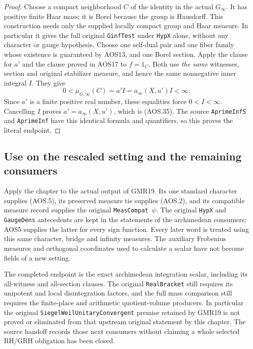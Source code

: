 \begin{proof}
Choose a compact neighborhood $C$ of the identity in the actual
$G_\infty$.  It has positive finite Haar mass; it is Borel because
the group is Hausdorff.  This construction needs only the supplied
locally compact group and Haar measure.  In particular it gives
the full original \texttt{GinfTest} under \texttt{HypX} alone,
without any character or gauge hypothesis.  Choose one self-dual
pair and one fiber family
whose existence is guaranteed by AOS13, and one Borel section.
Apply the clause for $a'$ and the clause proved in AOS17 to
$f=1_C$.  Both use \emph{the same} witnesses, section and original
stabilizer measure, and hence the same nonnegative inner integral
$I$.  They give
\[
              0<\mu_{G,\infty}(C)=a'I
                      =a_\infty(X,u')I<\infty.
\]
Since $a'$ is a finite positive real number, these equalities
force $0<I<\infty$.  Cancelling $I$ proves
$a'=a_\infty(X,u')$, which is (AOS.35).  The source
\texttt{AprimeInfS} and \texttt{AprimeInf} have this identical
formula and quantifiers, so this proves the literal endpoint.
\end{proof}

\subsection{Use on the rescaled setting and the remaining consumers}

Apply the chapter to the actual output of GMR19.  Its one standard
character supplies (AOS.5), its preserved measure tie supplies
(AOS.2), and its compatible measure record supplies the original
\texttt{MeasCompat\,$\psi$}.  The original \texttt{HypX} and
\texttt{GaugeDens} antecedents are kept in the statements of the
archimedean consumers; AOS5 supplies the latter for every sign
function.  Every later word is treated using this same
character, bridge and infinity measures.  The auxiliary Frobenius
measures and orthogonal coordinates used to calculate a scalar
have not become fields of a new setting.

The completed endpoint is the exact archimedean integration scalar,
including its all-witness and all-section clauses.  The original
\texttt{RealBracket} still requires its unipotent and local
disintegration factors, and the full mass comparison still requires
the finite-place and arithmetic quotient-volume producers.  In
particular the original \texttt{SiegelWeilUnitaryConvergent}
premise retained by GMR19 is not proved or eliminated from that
upstream original statement by this chapter.  The source handoff
records those next consumers without claiming a whole selected
RH/GRH obligation has been closed.
